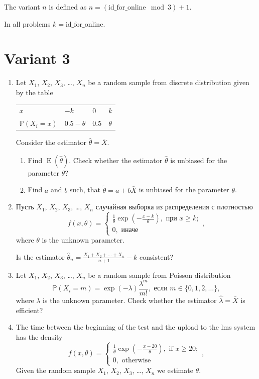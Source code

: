 \documentclass[12pt]{article}
\DeclareMathOperator{\E}{E}
\def \P{\mathbb{P}}
\newcommand \id {\mathrm{id}\_\mathrm{for}\_\mathrm{online}}
\begin{document}
\newpage

The variant $n$ is defined as $n=(\id \mod 3)+1$. 

In all problems $k=\id$.

\section*{Variant 3}
\begin{enumerate}

\item  Let $X_1$, $X_2$, $X_3$, \ldots, $X_n$  be a random sample from 
discrete distribution given by the table

\begin{tabular}{@{}llll@{}}
  \toprule
   $x$           & $-k$ & $0$ & $k$ \\ 
   $\P(X_i = x)$ & $0.5-\theta$ & $0.5$ & $\theta$ \\
  \bottomrule
\end{tabular}
			
Consider the estimator $\hat \theta = \bar X$.
\begin{enumerate}
\item Find $\E(\hat \theta)$. 
Check whether the estimator $\hat \theta$ is unbiased for the parameter $\theta$?
\item Find $a$ and $b$ such, 
that $\tilde \theta = a + b\bar X$ is unbiased for the parameter $\theta$.
\end{enumerate} 



\item Пусть $X_1$, $X_2$, $X_3$, \ldots, $X_n$ случайная выборка из распределения с плотностью
\[
  f(x, \theta) = \begin{cases}
    \frac{1}{\theta}\exp\left(-\frac{x-k}{\theta}\right), \text{ при } x\geq k; \\
    0, \text{ иначе}
  \end{cases},    
\]
where $\theta$  is the unknown parameter. 

Is the estimator $\hat\theta_n = \frac{X_1 + X_2 + \ldots + X_n}{n+1} - k$ consistent?


\item Let $X_1$, $X_2$, $X_3$, \ldots, $X_n$ 
be a random sample from Poisson distribution
\[
\P(X_i = m) = \exp(-\lambda)\frac{\lambda^m}{m!}, \text{ если } m \in \{0, 1, 2, \ldots\},
\]
where $\lambda$  is the unknown parameter. 
Check whether the estimator $\hat\lambda = \bar X$ is efficient?


\item  The time between the beginning of the test and the upload to the lms system
has the density
\[
  f(x, \theta) = \begin{cases}
    \frac{1}{\theta}\exp\left(-\frac{x-20}{\theta}\right), \text{ if } x\geq 20; \\
    0, \text{ otherwise}
  \end{cases},    
\]
Given the random sample $X_1$, $X_2$, $X_3$, \ldots, $X_n$ we estimate $\theta$. 


\end{enumerate}
\end{document}
